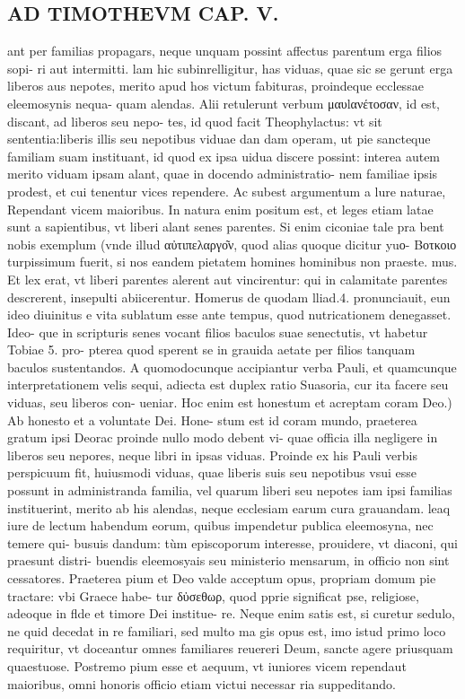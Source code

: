 \documentclass{article}
\begin{document}
\begin{pages}
\section*{AD TIMOTHEVM CAP. V. }
\marginpar{[ p.105 ]}\pstart ant per familias propagars, neque unquam possint affectus parentum erga filios sopi- ri aut intermitti. lam hic subinrelligitur, has viduas, quae sic se gerunt erga liberos aus nepotes, merito apud hos victum fabituras, proindeque ecclessae eleemosynis nequa- quam alendas. Alii retulerunt verbum μαυlανέτοσαν, id est, discant, ad liberos seu nepo- tes, id quod facit Theophylactus: vt sit sententia:liberis illis seu nepotibus viduae dan dam operam, ut pie sancteque familiam suam instituant, id quod ex ipsa uidua discere possint: interea autem merito viduam ipsam alant, quae in docendo administratio- nem familiae ipsis prodest, et cui tenentur vices rependere. Ac subest argumentum a lure naturae, Rependant vicem maioribus. In natura enim positum est, et leges etiam latae sunt a sapientibus, vt liberi alant senes parentes. Si enim ciconiae tale pra bent nobis exemplum (vnde illud αὐτιπελαργο͂ν, quod alias quoque dicitur yuο- Βοτκοιο turpissimum fuerit, si nos eandem pietatem homines hominibus non praeste. mus. Et lex erat, vt liberi parentes alerent aut vincirentur: qui in calamitate parentes descrerent, insepulti abiicerentur. Homerus de quodam lliad.4. pronunciauit, eun ideo diuinitus e vita sublatum esse ante tempus, quod nutricationem denegasset. Ideo- que in scripturis senes vocant filios baculos suae senectutis, vt habetur Tobiae 5. pro- pterea quod sperent se in grauida aetate per filios tanquam baculos sustentandos. A quomodocunque accipiantur verba Pauli, et quamcunque interpretationem velis sequi, adiecta est duplex ratio Suasoria, cur ita facere seu viduas, seu liberos con- ueniar.  \pend\pstart Hoc enim est honestum et acreptam coram Deo.) Ab honesto et a voluntate Dei. Hone- stum est id coram mundo, praeterea gratum ipsi Deorac proinde nullo modo debent vi- quae officia illa negligere in liberos seu nepores, neque libri in ipsas viduas. Proinde ex his Pauli verbis perspicuum fit, huiusmodi viduas, quae liberis suis seu nepotibus vsui esse possunt in administranda familia, vel quarum liberi seu nepotes iam ipsi familias instituerint, merito ab his alendas, neque ecclesiam earum cura grauandam. leaq iure de lectum habendum eorum, quibus impendetur publica eleemosyna, nec temere qui- busuis dandum: tùm episcoporum interesse, prouidere, vt diaconi, qui praesunt distri- buendis eleemosyais seu ministerio mensarum, in officio non sint cessatores. Praeterea pium et Deo valde acceptum opus, propriam domum pie tractare: vbi Graece habe- tur δὐσεθωρ, quod pprie significat pse, religiose, adeoque in flde et timore Dei institue- re. Neque enim satis est, si curetur sedulo, ne quid decedat in re familiari, sed multo ma gis opus est, imo istud primo loco requiritur, vt doceantur omnes familiares reuereri Deum, sancte agere priusquam quaestuose. Postremo pium esse et aequum, vt iuniores vicem rependaut maioribus, omni honoris officio etiam victui necessar ria suppeditando.  \pend

\end{pages}
\end{document}
